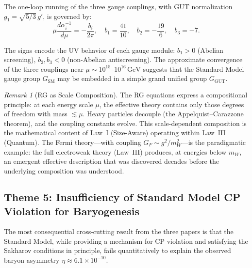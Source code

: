 \documentclass[12pt]{article}
\theoremstyle{definition}
\theoremstyle{remark}
\newtheorem{remark}[theorem]{Remark}
\newcommand{\GeV}{\,\mathrm{GeV}}
\begin{document}
The one-loop running of the three gauge couplings, with GUT normalization $g_1 = \sqrt{5/3}\,g'$, is governed by:
\begin{equation}
\label{eq:rge-unified}
\mu \frac{d\alpha_i^{-1}}{d\mu} = -\frac{b_i}{2\pi}, \quad
b_1 = \frac{41}{10}, \quad b_2 = -\frac{19}{6}, \quad b_3 = -7.
\end{equation}

The signs encode the UV behavior of each gauge module: $b_1 > 0$ (Abelian screening), $b_2, b_3 < 0$ (non-Abelian antiscreening). The approximate convergence of the three couplings near $\mu \sim 10^{15}$--$10^{16}\GeV$ suggests that the Standard Model gauge group $G_{\mathrm{SM}}$ may be embedded in a simple grand unified group $G_{\mathrm{GUT}}$.

\begin{remark}[RG as Scale Composition]
The RG equations express a compositional principle: at each energy scale $\mu$, the effective theory contains only those degrees of freedom with mass $\lesssim \mu$. Heavy particles decouple (the Appelquist--Carazzone theorem), and the coupling constants evolve. This scale-dependent composition is the mathematical content of Law~I (Size-Aware) operating within Law~III (Quantum). The Fermi theory---with coupling $G_F \sim g^2/m_W^2$---is the paradigmatic example: the full electroweak theory (Law~III) produces, at energies below $m_W$, an emergent effective description that was discovered decades before the underlying composition was understood.
\end{remark}

\subsection{Theme 5: Insufficiency of Standard Model CP Violation for Baryogenesis}

The most consequential cross-cutting result from the three papers is that the Standard Model, while providing a mechanism for CP violation and satisfying the Sakharov conditions in principle, fails quantitatively to explain the observed baryon asymmetry $\eta \approx 6.1 \times 10^{-10}$.
\end{document}
